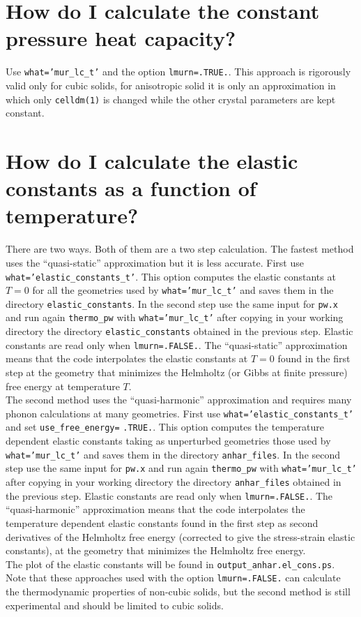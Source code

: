 \documentclass[12pt,a4paper]{article}
\begin{document}
\newpage
\section{\color{coral}How do I calculate the constant pressure heat capacity?}
Use \texttt{what='mur\_lc\_t'} and the option \texttt{lmurn=.TRUE.}.
This approach is rigorously valid only for cubic solids, for anisotropic
solid it is only an approximation in which only \texttt{celldm(1)} is
changed while the other crystal parameters are kept constant.

\newpage
\section{\color{coral}How do I calculate the elastic constants 
as a function of temperature?}
There are two ways. Both of them are a two step calculation. 
The fastest method uses the ``quasi-static'' approximation but it
is less accurate.
First use 
\texttt{what='elastic\_constants\_t'}. This option computes the elastic
constants at $T=0$ for all the geometries used by 
\texttt{what='mur\_lc\_t'} and
saves them in the directory \texttt{elastic\_constants}.  
In the second step use the same input for \texttt{pw.x} and run again 
\texttt{thermo\_pw} with \texttt{what='mur\_lc\_t'} after copying in your
working directory the directory \texttt{elastic\_constants} obtained 
in the previous step. Elastic constants are read only when
\texttt{lmurn=.FALSE.}.
The ``quasi-static'' approximation means that the code interpolates
the elastic constants at $T=0$ found in the first step at the geometry that
minimizes the Helmholtz (or Gibbs at finite pressure) free energy at
temperature $T$. \\
The second method uses the ``quasi-harmonic'' approximation and
requires many phonon calculations at many geometries.
First use \texttt{what='elastic\_constants\_t'} and set
\texttt{use\_free\_energy=} \texttt{.TRUE.}. This option computes the 
temperature dependent elastic constants taking as unperturbed geometries 
those used by \texttt{what='mur\_lc\_t'} and saves them in the directory 
\texttt{anhar\_files}.  
In the second step use the same input for \texttt{pw.x} and run again 
\texttt{thermo\_pw} with \texttt{what='mur\_lc\_t'} after copying in your
working directory the directory \texttt{anhar\_files} obtained 
in the previous step. Elastic constants are read only when
\texttt{lmurn=.FALSE.}. 
The ``quasi-harmonic'' approximation means that the code interpolates
the temperature dependent elastic constants found in the first step as
second derivatives of the Helmholtz free energy (corrected to give the
stress-strain elastic constants), at the geometry that
minimizes the Helmholtz free energy. \\
The plot of the elastic constants will be found in 
\texttt{output\_anhar.el\_cons.ps}.
Note that these approaches used with the option \texttt{lmurn=.FALSE.} can
calculate the thermodynamic properties of non-cubic solids, but the
second method is still experimental and should be limited to cubic solids.
\end{document}
